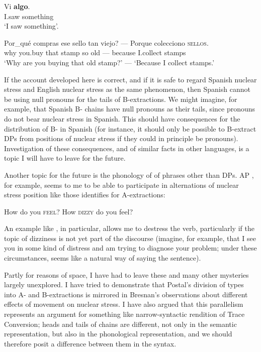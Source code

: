 \documentclass[output=paper]{LSP/langsci}
\begin{document}
\ex
\gll  Vi  \textbf{algo}.\\
  I.saw  something\\
\glt `I saw \textup{something'}.

\ex
\gll  Por\_qué  compras  ese  sello  tan  viejo? ---  Porque  colecciono  \textsc{sellos}.\\
	why  you.buy  that  stamp  so  old  --- because  I.collect  stamps\\
\glt `Why are you buying that old stamp?' --- `Because I collect stamps.’ 
\z
\z

If the account developed here is correct, and if it is safe to regard Spanish nuclear stress and English nuclear stress as the same phenomenon, then Spanish cannot be using null pronouns for the tails of B-extractions.  We might imagine, for example, that Spanish B- chains have null  pronouns as their tails, since  pronouns do not bear nuclear stress in Spanish.  This should have consequences for the distribution of B- in Spanish (for instance, it should only be possible to B-extract DPs from positions of nuclear stress if they could in principle be  pronouns).  Investigation of these consequences, and of similar facts in other languages, is a topic I will have to leave for the future.

  Another topic for the future is the phonology of  of phrases other than DPs.  AP , for example, seems to me to be able to participate in alternations of nuclear stress position like those \citet{Bresnan1971} identifies for A-extractions:


\ea%

\ea\label{ex:richards:66a} How do you \textsc{feel}?
\ex\label{ex:richards:66b} How \textsc{dizzy} do you feel?
\z
\z

An example like , in particular, allows me to destress the verb, particularly if the topic of dizziness is not yet part of the discourse (imagine, for example, that I see you in some kind of distress and am trying to diagnose your problem; under these circumstances,  seems like a natural way of saying the sentence).  

  Partly for reasons of space, I have had to leave these and many other mysteries largely unexplored.  I have tried to demonstrate that Postal’s division of  types into A- and B-extractions is mirrored in Bresnan’s observations about different effects of movement on nuclear stress.  I have also argued that this parallelism represents an argument for something like  narrow-syntactic rendition of Trace Conversion; heads and tails of chains are different, not only in the semantic representation, but also in the phonological representation, and we should therefore posit a difference between them in the syntax.
 
\end{document}
